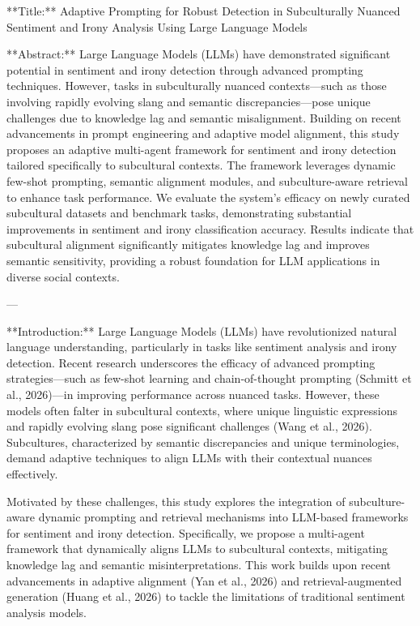 **Title:**  
Adaptive Prompting for Robust Detection in Subculturally Nuanced Sentiment and Irony Analysis Using Large Language Models  

**Abstract:**  
Large Language Models (LLMs) have demonstrated significant potential in sentiment and irony detection through advanced prompting techniques. However, tasks in subculturally nuanced contexts—such as those involving rapidly evolving slang and semantic discrepancies—pose unique challenges due to knowledge lag and semantic misalignment. Building on recent advancements in prompt engineering and adaptive model alignment, this study proposes an adaptive multi-agent framework for sentiment and irony detection tailored specifically to subcultural contexts. The framework leverages dynamic few-shot prompting, semantic alignment modules, and subculture-aware retrieval to enhance task performance. We evaluate the system's efficacy on newly curated subcultural datasets and benchmark tasks, demonstrating substantial improvements in sentiment and irony classification accuracy. Results indicate that subcultural alignment significantly mitigates knowledge lag and improves semantic sensitivity, providing a robust foundation for LLM applications in diverse social contexts.  

---

**Introduction:**  
Large Language Models (LLMs) have revolutionized natural language understanding, particularly in tasks like sentiment analysis and irony detection. Recent research underscores the efficacy of advanced prompting strategies—such as few-shot learning and chain-of-thought prompting (Schmitt et al., 2026)—in improving performance across nuanced tasks. However, these models often falter in subcultural contexts, where unique linguistic expressions and rapidly evolving slang pose significant challenges (Wang et al., 2026). Subcultures, characterized by semantic discrepancies and unique terminologies, demand adaptive techniques to align LLMs with their contextual nuances effectively.  

Motivated by these challenges, this study explores the integration of subculture-aware dynamic prompting and retrieval mechanisms into LLM-based frameworks for sentiment and irony detection. Specifically, we propose a multi-agent framework that dynamically aligns LLMs to subcultural contexts, mitigating knowledge lag and semantic misinterpretations. This work builds upon recent advancements in adaptive alignment (Yan et al., 2026) and retrieval-augmented generation (Huang et al., 2026) to tackle the limitations of traditional sentiment analysis models.  

